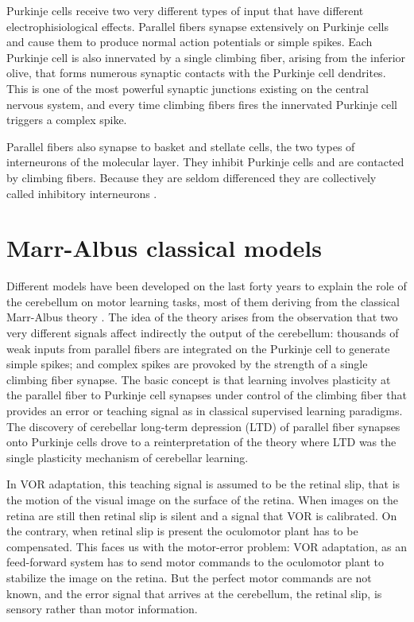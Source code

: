 \documentclass[12pt, a4paper,twoside]{tesi_upf}
\begin{document}
\begin{appendices}
Purkinje cells receive two very different types of input that have different electrophisiological effects. Parallel fibers synapse extensively on Purkinje cells and cause them to produce normal action potentials or simple spikes. Each Purkinje cell is also innervated by a single climbing fiber, arising from the inferior olive, that forms numerous synaptic contacts with the Purkinje cell dendrites. This is one of the most powerful synaptic junctions existing on the central nervous system, and every time climbing fibers fires the innervated Purkinje cell triggers a complex spike.

Parallel fibers also synapse to basket and stellate cells, the two types of interneurons of the molecular layer. They inhibit Purkinje cells and are contacted by climbing fibers. Because they are seldom differenced they are collectively called inhibitory interneurons \cite{Jorntell2010}.

\section{Marr-Albus classical models}

Different models have been developed on the last forty years to explain the role of the cerebellum on motor learning tasks, most of them deriving from the classical Marr-Albus theory \cite{Marr1969,Albus1971}. The idea of the theory arises from the observation that two very different signals affect indirectly the output of the cerebellum: thousands of weak inputs from parallel fibers are integrated on the Purkinje cell to generate simple spikes; and complex spikes are provoked by the strength of a single climbing fiber synapse. The basic concept is that learning involves plasticity at the parallel fiber to Purkinje cell synapses under control of the climbing fiber that provides an error or teaching signal as in classical supervised learning paradigms. The discovery of cerebellar long-term depression (LTD) of parallel fiber synapses onto Purkinje cells \cite{Ito1982} drove to a reinterpretation of the theory where LTD was the single plasticity mechanism of cerebellar learning.

In VOR adaptation, this teaching signal is assumed to be the retinal slip, that is the motion of the visual image on the surface of the retina. When images on the retina are still then retinal slip is silent and a signal that VOR is calibrated. On the contrary, when retinal slip is present the oculomotor plant has to be compensated. This faces us with the motor-error problem: VOR adaptation, as an feed-forward system has to send motor commands to the oculomotor plant to stabilize the image on the retina. But the perfect motor commands are not known, and the error signal that arrives at the cerebellum, the retinal slip, is sensory rather than motor information.


\end{appendices}
\end{document}
